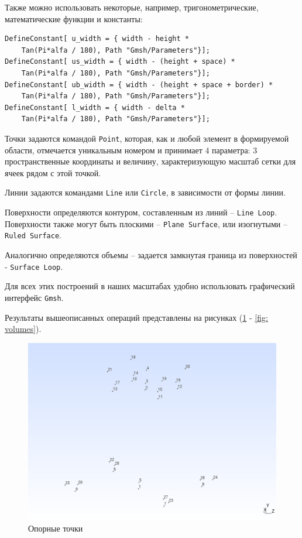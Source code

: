 \documentclass[a4paper, 14pt]{extreport}
\begin{document}
Также можно использовать некоторые, например, тригонометрические,
математические функции и константы:

\begin{lstlisting}
DefineConstant[ u_width = { width - height * 
	Tan(Pi*alfa / 180), Path "Gmsh/Parameters"}];
DefineConstant[ us_width = { width - (height + space) * 
	Tan(Pi*alfa / 180), Path "Gmsh/Parameters"}];
DefineConstant[ ub_width = { width - (height + space + border) * 
	Tan(Pi*alfa / 180), Path "Gmsh/Parameters"}];
DefineConstant[ l_width = { width - delta * 
	Tan(Pi*alfa / 180), Path "Gmsh/Parameters"}];
\end{lstlisting}

Точки задаются командой \texttt{Point}, которая, как и любой элемент в формируемой области,
отмечается уникальным номером и принимает 4 параметра: 3 пространственные 
координаты и величину, характеризующую масштаб сетки для ячеек рядом с этой точкой.

Линии задаются командами \texttt{Line} или \texttt{Circle},
в зависимости от формы линии.

Поверхности определяются контуром, составленным из
линий -- \texttt{Line Loop}. Поверхности также могут быть
плоскими -- \texttt{Plane Surface}, или изогнутыми --
\texttt{Ruled Surface}.

Аналогично определяются объемы -- задается замкнутая 
граница из поверхностей - \texttt{Surface Loop}.

Для всех этих построений в наших масштабах удобно 
использовать графический интерфейс \texttt{Gmsh}.

Результаты вышеописанных операций представлены на рисунках 
(\ref{fig: main_points} - \ref{fig: volumes}).

\begin{figure}[H]
	\center
	\includegraphics[scale=0.4]{pictures/main_points.png}
	\caption{Опорные точки}
	\label{fig: main_points}
\end{figure}
\end{document}
